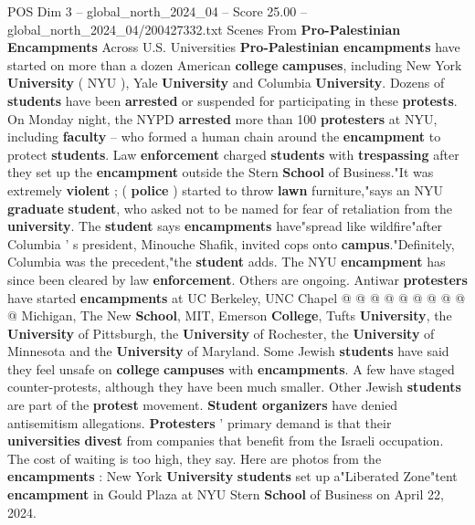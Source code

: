 \begin{textsample}{POS Dim 3 – global\_north\_2024\_04 – Score 25.00 – global\_north\_2024\_04/200427332.txt}  \label{ex:f3_pos_079}
Scenes From \textbf{Pro-Palestinian} \textbf{Encampments} Across U.S.
Universities \textbf{Pro-Palestinian} \textbf{encampments} have started on more than a dozen American \textbf{college} \textbf{campuses}, including New York \textbf{University} ( NYU ), Yale \textbf{University} and Columbia \textbf{University}.
Dozens of \textbf{students} have been \textbf{arrested} or suspended for participating in these \textbf{protests}.
On Monday night, the NYPD \textbf{arrested} more than 100 \textbf{protesters} at NYU, including \textbf{faculty} -- who formed a human chain around the \textbf{encampment} to protect \textbf{students}.
Law \textbf{enforcement} charged \textbf{students} with \textbf{trespassing} after they set up the \textbf{encampment} outside the Stern \textbf{School} of Business."It was extremely \textbf{violent} ; ( \textbf{police} ) started to throw \textbf{lawn} furniture,"says an NYU \textbf{graduate} \textbf{student}, who asked not to be named for fear of retaliation from the \textbf{university}.
The \textbf{student} says \textbf{encampments} have"spread like wildfire"after Columbia ' s president, Minouche Shafik, invited cops onto \textbf{campus}."Definitely, Columbia was the precedent,"the \textbf{student} adds.
The NYU \textbf{encampment} has since been cleared by law \textbf{enforcement}.
Others are ongoing.
Antiwar \textbf{protesters} have started \textbf{encampments} at UC Berkeley, UNC Chapel @ @ @ @ @ @ @ @ @ @ Michigan, The New \textbf{School}, MIT, Emerson \textbf{College}, Tufts \textbf{University}, the \textbf{University} of Pittsburgh, the \textbf{University} of Rochester, the \textbf{University} of Minnesota and the \textbf{University} of Maryland.
Some Jewish \textbf{students} have said they feel unsafe on \textbf{college} \textbf{campuses} with \textbf{encampments}.
A few have staged counter-protests, although they have been much smaller.
Other Jewish \textbf{students} are part of the \textbf{protest} movement. \textbf{Student} \textbf{organizers} have denied antisemitism allegations. \textbf{Protesters} ' primary demand is that their \textbf{universities} \textbf{divest} from companies that benefit from the Israeli occupation.
The cost of waiting is too high, they say.
Here are photos from the \textbf{encampments} : New York \textbf{University} \textbf{students} set up a"Liberated Zone"tent \textbf{encampment} in Gould Plaza at NYU Stern \textbf{School} of Business on April 22, 2024.

\end{textsample}
